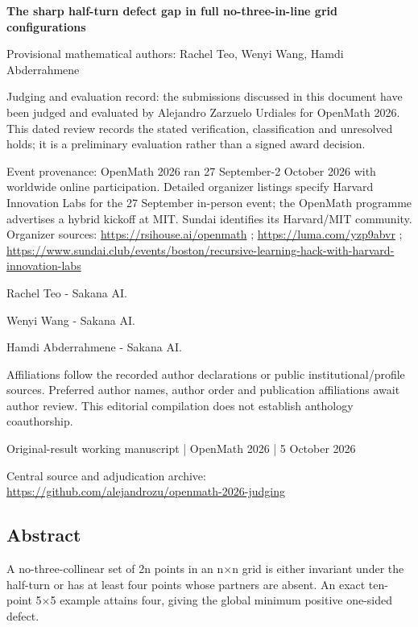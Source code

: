 \documentclass[11pt,a4paper]{article}
\begin{document}
{\LARGE\bfseries The sharp half-turn defect gap in full no-three-in-line grid configurations\par}\medskip
{\small Provisional mathematical authors: Rachel Teo, Wenyi Wang, Hamdi Abderrahmene\par}\medskip
{\small Judging and evaluation record: the submissions discussed in this document have been judged and evaluated by Alejandro Zarzuelo Urdiales for OpenMath 2026. This dated review records the stated verification, classification and unresolved holds; it is a preliminary evaluation rather than a signed award decision.\par}

{\small Event provenance: OpenMath 2026 ran 27 September-2 October 2026 with worldwide online participation. Detailed organizer listings specify Harvard Innovation Labs for the 27 September in-person event; the OpenMath programme advertises a hybrid kickoff at MIT. Sundai identifies its Harvard/MIT community. Organizer sources: \url{https://rsihouse.ai/openmath} ; \url{https://luma.com/yzp9abvr} ; \url{https://www.sundai.club/events/boston/recursive-learning-hack-with-harvard-innovation-labs}\par}

{\small Rachel Teo  -  Sakana AI.\par}

{\small Wenyi Wang  -  Sakana AI.\par}

{\small Hamdi Abderrahmene  -  Sakana AI.\par}

{\small Affiliations follow the recorded author declarations or public institutional/profile sources. Preferred author names, author order and publication affiliations await author review. This editorial compilation does not establish anthology coauthorship.\par}

{\small Original-result working manuscript | OpenMath 2026 | 5 October 2026\par}\medskip
{\small Central source and adjudication archive: \url{https://github.com/alejandrozu/openmath-2026-judging}\par}

\subsection{Abstract}
A no-three-collinear set of 2n points in an n\ensuremath{\times}n grid is either invariant under the half-turn or has at least four points whose partners are absent. An exact ten-point 5\ensuremath{\times}5 example attains four, giving the global minimum positive one-sided defect.
\end{document}
